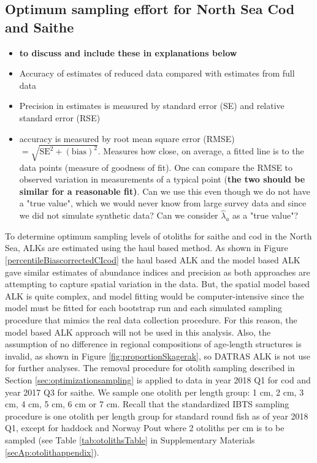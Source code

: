 \documentclass[a4paper 12pt]{article}
\numberwithin{equation}{section}
\begin{document}
\subsection{Optimum sampling effort for North Sea Cod and Saithe}
\label{sec:optimumeffortresults}
\begin{itemize}
\item {\bf to discuss and include these in explanations below}
\item Accuracy of estimates of reduced data compared with estimates from full data
\item Precision in estimates is measured by standard error (SE) and relative standard error (RSE)
\item accuracy is measured by root mean square error (RMSE) $= \sqrt{\mathrm{SE}^2 + (\mathrm{bias})^2}$. Measures how close, on average, a fitted line is to the data points (measure of goodness of fit). One can compare the RMSE to observed variation in measurements of a typical point {(\bf the two should be similar for a reasonable fit)}. Can we use this even though we do not have a "true value", which we would never know from large survey data and since we did not simulate synthetic data? Can we consider $\hat{\lambda}_{a}$ as a "true value"?
\end{itemize}

To determine optimum sampling levels of otoliths for saithe and cod in the North Sea, ALKs are estimated using the haul based  method. As shown in Figure \ref{percentileBiascorrectedCIcod}  the haul based ALK and the model based ALK gave similar estimates of abundance indices and precision as both approaches are attempting to capture spatial variation in the data. But, the spatial model based ALK  is  quite complex, and model fitting would be computer-intensive since the model must be fitted for each bootstrap run and each simulated sampling procedure that mimics the real data collection procedure. For this reason, the model based ALK approach will not be used in this analysis. Also, the assumption of no difference in regional compositions of age-length structures is invalid,  as shown in Figure \ref{fig:proportionSkagerak},  so DATRAS ALK is not use for further analyses. The removal procedure for otolith sampling described in Section \ref{sec:optimizationsampling} is applied to data in year 2018 Q1 for cod and year 2017 Q3 for saithe. We sample one otolith per length group: 1 cm, 2 cm, 3 cm, 4 cm, 5 cm, 6 cm or 7 cm. Recall that the standardized IBTS sampling procedure is one otolith per length group for standard round fish as of year 2018 Q1, except for haddock and Norway Pout where 2 otoliths per cm is to be sampled (see Table \ref{tab:otolithsTable} in Supplementary Materials \ref{secAp:otolithappendix}). 
\end{document}
